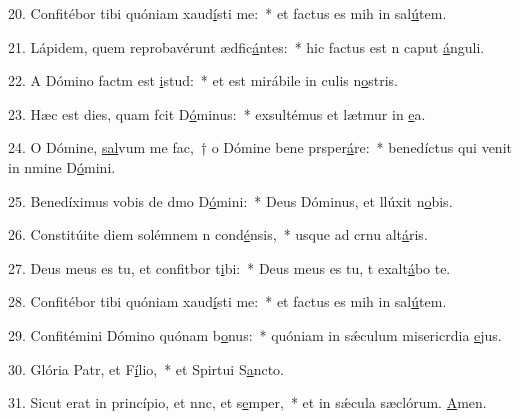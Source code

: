20. Confitébor tibi quóniam xaud\uline{í}sti me:~* et factus es mih in sal\uline{ú}tem.\par 
21. Lápidem, quem reprobavérunt ædfic\uline{á}ntes:~* hic factus est n caput \uline{á}nguli.\par 
22. A Dómino factm est \uline{i}stud:~* et est mirábile in culis n\uline{o}stris.\par 
23. Hæc est dies, quam fcit D\uline{ó}minus:~* exsultémus et lætmur in \uline{e}a.\par 
24. O Dómine, \uline{sal}vum me fac,~† o Dómine bene prsper\uline{á}re:~* benedíctus qui venit in nmine D\uline{ó}mini.\par 
25. Benedíximus vobis de dmo D\uline{ó}mini:~* Deus Dóminus, et llúxit n\uline{o}bis.\par 
26. Constitúite diem solémnem n cond\uline{é}nsis,~* usque ad crnu alt\uline{á}ris.\par 
27. Deus meus es tu, et confitbor t\uline{i}bi:~* Deus meus es tu, t exalt\uline{á}bo te.\par 
28. Confitébor tibi quóniam xaud\uline{í}sti me:~* et factus es mih in sal\uline{ú}tem.\par 
29. Confitémini Dómino quónam b\uline{o}nus:~* quóniam in sǽculum misericrdia \uline{e}jus.\par 
30. Glória Patr, et F\uline{í}lio,~* et Spirtui S\uline{a}ncto.\par 
31. Sicut erat in princípio, et nnc, et s\uline{e}mper,~* et in sǽcula sæclórum. \uline{A}men.\par 
